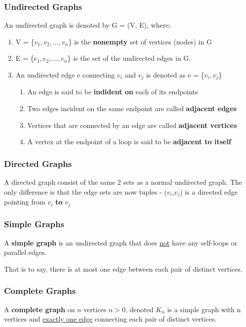 \documentclass{article}
\newcommand{\sbreak}{\vspace{10pt}}
\begin{document}
\subsubsection{Undirected Graphs}
An undirected graph is denoted by G = (V, E), where:
\begin{enumerate}
    \item V = \{$v_1, v_2, ..., v_n$\} is the \textbf{nonempty} set of vertices (nodes) in G
    \item E = \{$e_1, e_2,...,e_n$\} is the set of the undirected edges in G.
    \item An undirected edge e connecting $v_i$ and $v_j$ is denoted as e = \{$v_i, v_j$\}
    \begin{enumerate}
        \item An edge is said to be \textbf{indident on} each of its endpoints
        \item Two edges incident on the same endpoint are called \textbf{adjacent edges}
        \item Vertices that are connected by an edge are called \textbf{adjacent vertices}
        \item A vertex at the endpoint of a loop is said to be \textbf{adjacent to itself}
    \end{enumerate}
\end{enumerate}

\subsubsection{Directed Graphs}
A directed graph consist of the same 2 sets as a normal undirected graph. The only difference is that the edge sets are now tuples - ($v_i$,$v_j$) is a directed edge pointing from $v_i$ \textbf{to} $v_j$

\subsubsection{Simple Graphs}
A \textbf{simple graph} is an undirected graph that does \underline{not} have any self-loops or parallel edges.

\sbreak

That is to say, there is at most one edge between each pair of distinct vertices.

\subsubsection{Complete Graphs}
A \textbf{complete graph} on $n$ vertices $n>0$, denoted $K_n$ is a simple graph with n vertices and \underline{exactly one edge} connecting each pair of distinct vertices.
\end{document}

